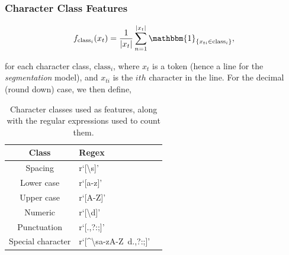 \documentclass{beamer}
\begin{document}
\begin{frame}
\frametitle{Character Class Features}

$$
f_{\text{class}_i}(x_t) = \frac{1}{|x_t|}\sum_{n=1}^{|x_t|} \mathbbm{1}_{\{x_{ti} \in \text{class}_i\}},
\label{eq:classfunctions}
$$

for each character class, $\text{class}_i$, where $x_t$ is a token (hence a line for the \emph{segmentation} model), and $x_{ti}$ is the $ith$ character in the line. For the decimal (round down) case, we then define,

\begin{table}[h]
\begin{center}
\begin{tabular}{|c|l|l|}
\hline
Class & Regex\\
\hline
Spacing & r`[\textbackslash s]'\\
Lower case & r`[a-z]'\\
Upper case & r`[A-Z]'\\
Numeric & r`[\textbackslash d]'\\
Punctuation & r`[\(\).,?:;]'\\
Special character & r`[\^{}\textbackslash sa-zA-Z\ d\(\).,?:;]'\\
\hline
\end{tabular}
\caption[Character classes used as features, along with the regular expressions used to count them.]{Character classes used as features, along with the regular expressions used to count them.}
\label{table:characterclasses}
\end{center}
\end{table}

\end{frame}


\end{document}
